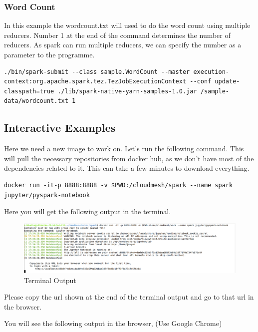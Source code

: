 \subsubsection{Word Count}

In this example the wordcount.txt will used to do the word count using
multiple reducers. Number 1 at the end of the command determines the
number of reducers. As spark can run multiple reducers, we can specify
the number as a parameter to the programme.

\begin{lstlisting}
./bin/spark-submit --class sample.WordCount --master execution-context:org.apache.spark.tez.TezJobExecutionContext --conf update-classpath=true ./lib/spark-native-yarn-samples-1.0.jar /sample-data/wordcount.txt 1
\end{lstlisting}

\subsection{Interactive Examples}

Here we need a new image to work on. Let's run the following command.
This will pull the necessary repositories from docker hub, as we don't
have most of the dependencies related to it. This can take a few minutes
to download everything.

\begin{lstlisting}
docker run -it-p 8888:8888 -v $PWD:/cloudmesh/spark --name spark jupyter/pyspark-notebook
\end{lstlisting}

Here you will get the following output in the terminal.

\begin{figure}[htbp]
\centering
\includegraphics[width=1.0\textwidth]{images/docker-spark-jupyter.png}
\caption{Terminal Output}
\end{figure}

Please copy the url shown at the end of the terminal output and go to
that url in the browser.

You will see the following output in the browser, (Use Google Chrome)

